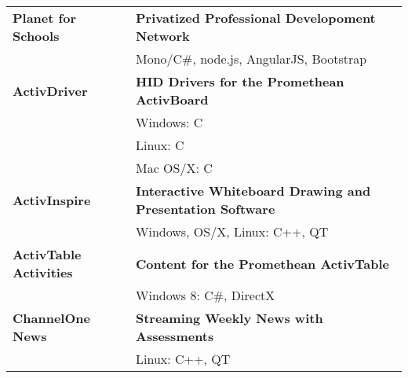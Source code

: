 \begin{tabular}{ p{4cm} p{10.5cm} }
\midrule
\textbf{Planet for Schools} & \textbf{Privatized Professional Developoment Network}\\
 & Mono/C\#, node.js, AngularJS, Bootstrap\\
\midrule
\textbf{ActivDriver} & \textbf{HID Drivers for the Promethean ActivBoard}\\
 & Windows: C\\
 & Linux: C\\
 & Mac OS/X: C\\
\midrule
\textbf{ActivInspire} & \textbf{Interactive Whiteboard Drawing and Presentation Software}\\
 & Windows, OS/X, Linux: C++, QT\\
\midrule
\textbf{ActivTable Activities} & \textbf{Content for the Promethean ActivTable}\\
 & Windows 8: C\#, DirectX\\
\midrule
\textbf{ChannelOne News} & \textbf{Streaming Weekly News with Assessments}\\
 & Linux: C++, QT\\
\end{tabular}
